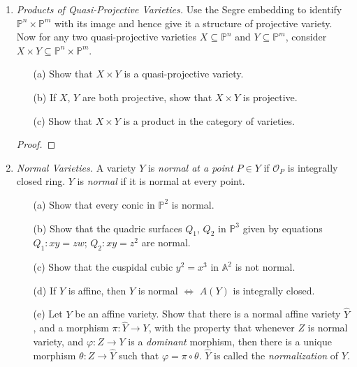 \documentclass[12pt]{article}
\newcommand{\A}{\mathbb{A}}
\newcommand{\OO}{\mathcal{O}}
\newcommand{\PP}{\mathbb{P}}
\theoremstyle{definition}
\begin{document}
\begin{enumerate} [label=\textbf{\arabic*.}, leftmargin=-0.05em]
\item \textit{Products of Quasi-Projective Varieties.} Use the Segre embedding to identify $\PP^n \times \PP^m$ with its image and hence give it a structure of projective variety. Now for any two quasi-projective varieties $X \subseteq \PP^n$ and $Y \subseteq \PP^m$, consider $X \times Y \subseteq \PP^n \times \PP^m$.
\begin{itemize}
    \item[(a)] Show that $X \times Y$ is a quasi-projective variety.
    \item[(b)] If $X$, $Y$ are both projective, show that $X \times Y$ is projective.
    \item[(c)] Show that $X \times Y$ is a product in the category of varieties.
\end{itemize}

\begin{proof}
    
\end{proof}

\item \textit{Normal Varieties.} A variety $Y$ is \textit{normal at a point $P \in Y$} if $\OO_P$ is integrally closed ring. $Y$ is \textit{normal} if it is normal at every point. 
\begin{itemize}
    \item[(a)] Show that every conic in $\PP^2$ is normal.
    \item[(b)] Show that the quadric surfaces $Q_1$, $Q_2$ in $\PP^3$ given by equations $Q_1 : xy = zw$; $Q_2 : xy = z^2$ are normal.
    \item[(c)] Show that the cuspidal cubic $y^2 = x^3$ in $\A^2$ is not normal.
    \item[(d)] If $Y$ is affine, then $Y$ is normal $\iff$ $A(Y)$ is integrally closed.
    \item[(e)] Let $Y$ be an affine variety. Show that there is a normal affine variety $\hat{Y}$, and a morphism $\pi : \hat{Y} \to Y$, with the property that whenever $Z$ is normal variety, and $\varphi :Z \to Y$ is a \textit{dominant} morphism, then there is a unique morphism $\theta : Z \to \hat{Y}$ such that $\varphi = \pi \circ \theta$. $\hat{Y}$ is called the \textit{normalization} of $Y$.
\end{itemize}


\end{enumerate}
\end{document}
